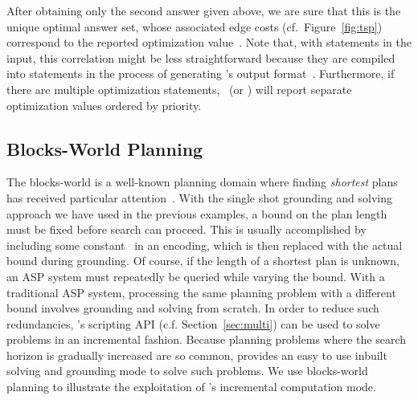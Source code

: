 %
After obtaining only the second answer given above,
we are sure that this is the unique optimal answer set,
whose associated edge costs (cf.\ Figure~\ref{fig:tsp}) correspond to
the reported optimization value~.
Note that, with  statements in the input, this correlation
might be less straightforward because they are compiled into 
statements in the process of generating \lparse's output format~\cite{lparseManual}.
Furthermore, if there are multiple optimization statements,
\clasp\ (or \clingo) will report separate optimization values ordered by priority.

\subsection{Blocks-World Planning}\label{subsec:ex:block}

The blocks-world is a well-known planning domain
where finding \emph{shortest} plans has received particular attention~\cite{gupnau92a}.
With the single shot grounding and solving approach we have used in the previous examples,
a bound on the plan length must be fixed before search can proceed.
This is usually accomplished by including some constant~
in an encoding, which is then replaced with the actual bound during grounding.
Of course, if the length of a shortest plan is unknown,
an ASP system must repeatedly be queried while varying the bound.
With a traditional ASP system, processing
the same planning problem with a different bound
involves grounding and solving from scratch.
\tbr
In order to reduce such redundancies,
\clingo's scripting API (c.f. Section~\ref{sec:multi}) can be used to solve problems in an incremental fashion.
Because planning problems where the search horizon is gradually increased are so common,
\clingo provides an easy to use inbuilt solving and grounding mode to solve such problems.
We use blocks-world planning to illustrate the exploitation of
\clingo's incremental computation mode.

